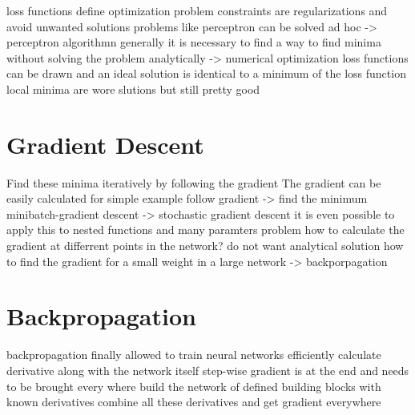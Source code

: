 %
%

loss functions define optimization problem
constraints are regularizations and avoid unwanted solutions
problems like perceptron can be solved ad hoc -> perceptron algorithmn
generally it is necessary to find a way to find minima without solving the problem analytically -> numerical optimization
loss functions can be drawn and an ideal solution is identical to a minimum of the loss function
local minima are wore slutions but still pretty good


\section{Gradient Descent}
Find these minima iteratively by following the gradient
The gradient can be easily calculated for simple example
follow gradient -> find the minimum
minibatch-gradient descent -> stochastic gradient descent
it is even possible to apply this to nested functions and many paramters
problem how to calculate the gradient at differrent points in the network? do not want analytical solution
how to find the gradient for a small weight in a large network
-> backporpagation



\section{Backpropagation}
backpropagation finally allowed to train neural networks efficiently
calculate derivative along with the network itself step-wise
gradient is at the end and needs to be brought every where
build the network of defined building blocks with known derivatives
combine all these derivatives and get gradient everywhere



